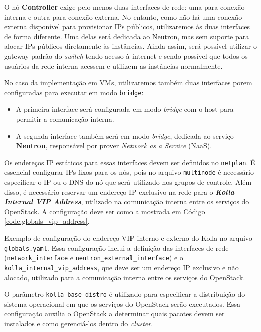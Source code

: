 O nó \textbf{Controller} exige pelo menos duas interfaces de rede: uma para conexão interna e outra para conexão externa. No entanto, como não há uma conexão externa disponível para provisionar IPs públicos, utilizaremos às duas interfaces de forma diferente. Uma delas será dedicada ao Neutron, mas sem suporte para alocar IPs públicos diretamente às instâncias. Ainda assim, será possível utilizar o gateway padrão do \textit{switch} tendo acesso à internet e sendo possível que todos os usuários da rede interna acessem e utilizem as instâncias normalmente.

No caso da implementação em VMs, utilizaremos também duas interfaces porem configuradas para executar em modo \texttt{bridge}:
\begin{itemize}
    \item A primeira interface será configurada em modo \textit{bridge} com o host para permitir a comunicação interna.
    \item A segunda interface também será em modo \textit{bridge}, dedicada ao serviço \textbf{Neutron}, responsável por prover \textit{Network as a Service} (NaaS).
\end{itemize}

Os endereços IP estáticos para essas interfaces devem ser definidos no \texttt{netplan}. É essencial configurar IPs fixos para os nós, pois no arquivo \texttt{multinode} é necessário especificar o IP ou o DNS do nó que será utilizado nos grupos de controle. Além disso, é necessário reservar um endereço IP exclusivo na rede para o \textbf{\textit{Kolla Internal VIP Address}}, utilizado na comunicação interna entre os serviços do OpenStack. A configuração deve ser como a mostrada em Código \ref{code:globals_vip_address}.

\begin{listing}[h!]
    \noindent{}  
  \caption{Exemplo de configuração do endereço VIP interno e externo do Kolla no arquivo \texttt{globals.yaml}. Essa configuração inclui a definição das interfaces de rede (\texttt{network\_interface} e \texttt{neutron\_external\_interface}) e o \texttt{kolla\_internal\_vip\_address}, que deve ser um endereço IP exclusivo e não alocado, utilizado para a comunicação interna entre os serviços do OpenStack.}
  \label{code:globals_vip_address}
\end{listing}

O parâmetro \texttt{kolla\_base\_distro} é utilizado para especificar a distribuição do sistema operacional em que os serviços do OpenStack serão executados. Essa configuração auxilia o OpenStack a determinar quais pacotes devem ser instalados e como gerenciá-los dentro do \textit{cluster}.

